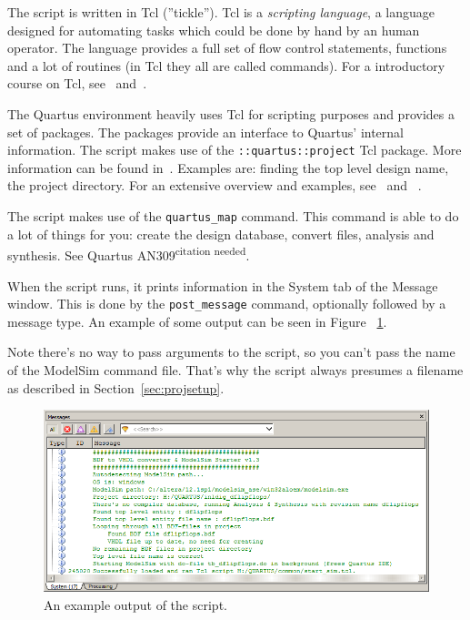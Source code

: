\documentclass[11pt,a4paper,final,oneside,titlepage,fleqn]{article}
\begin{document}
The script is written in Tcl (''tickle''). Tcl is a \textit{scripting language},
a language designed for automating tasks which could be done by hand by an
human operator. The language provides a full set of flow control statements,
functions and a lot of routines (in Tcl they all are called commands). For a
introductory course on Tcl, see~\cite{web/intro_tcl} and~\cite{book/pptcltk}.

The Quartus environment heavily uses Tcl for scripting purposes and provides a
set of packages. The packages provide an interface to Quartus' internal
information. The script makes use of the \texttt{::quartus::project} Tcl
package. More information can be found in~\cite{web/pkg_quartus_project}.
Examples are: finding the top level design name, the project directory. For an
extensive overview and examples, see~\cite{pdf/scripting_quartus} and~%
\cite{web/example_quartustcl}.

The script makes use of the \texttt{quartus\_map} command. This command is
able to do a lot of  things for you: create the design database, convert files,
analysis and synthesis. See Quartus AN309\textsuperscript{citation needed}.

When the script runs, it prints information in the System tab of the Message
window. This is done by the \texttt{post\_message} command, optionally
followed by a message type. An example of some output can be seen in Figure~%
\ref{015examplemessage}.

Note there's no way to pass arguments to the script, so you can't pass the
name of the ModelSim command file. That's why the script always presumes a
filename as described in Section~\ref{sec:projsetup}.

\begin{figure}[!h]
  \centering
  \includegraphics[scale=0.44]{015examplemessage.png}
  \caption{An example output of the script.}
  \label{015examplemessage}
\end{figure}
\end{document}
